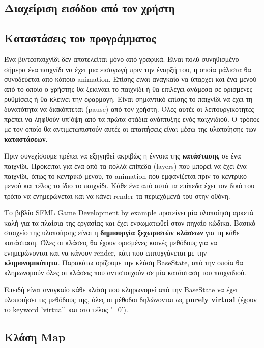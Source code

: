 \documentclass[12pt]{article}
\begin{document}
	
	
	\subsection{Διαχείριση εισόδου από τον χρήστη}
	
	\subsection{Καταστάσεις του προγράμματος}
	Ένα βιντεοπαιχνίδι δεν αποτελείται μόνο από γραφικά. Είναι πολύ συνηθισμένο σήμερα ένα παιχνίδι να έχει μια εισαγωγή πριν την έναρξή του, η οποία μάλιστα θα συνοδεύεται από κάποιο animation. Επίσης είναι αναγκαίο να ύπαρχει και ένα μενού από το οποίο ο χρήστης θα ξεκινάει το παιχνίδι ή θα επιλέγει ανάμεσα σε ορισμένες ρυθμίσεις ή θα κλείνει την εφαρμογή. Είναι σημαντικό επίσης το παιχνίδι να έχει τη δυνατότητα να διακόπτεται (pause) από τον χρήστη. Όλες αυτές οι λειτουργικότητες πρέπει να ληφθούν υπ'όψη από τα πρώτα στάδια ανάπτυξης ενός παιχνιδιού. Ο τρόπος με τον οποίο θα αντιμετωπιστούν αυτές οι απαιτήσεις είναι μέσω της υλοποίησης των \textbf{καταστάσεων}.
	
	Πριν συνεχίσουμε πρέπει να εξηγηθεί ακριβώς η έννοια της \textbf{κατάστασης} σε ένα παιχνίδι. Πρόκειται για ένα από τα πολλά επίπεδα (layers) που μπορεί να έχει ένα παιχνίδι, όπως το κεντρικό μενού, το animation που εμφανίζεται πριν το κεντρικό μενού και τέλος το ίδιο το παιχνίδι. Κάθε ένα από αυτά τα επίπεδα έχει τον δικό του τρόπο να ενημερώνεται και να κάνει render τα περιεχόμενά του στην οθόνη.
	
	Το βιβλίο SFML Game Development by example προτείνει μία υλοποίηση αρκετά καλή για τα πλαίσια της εργασίας και έχει ενσωματωθεί στον πηγαίο κώδικα. Βασικό στοιχείο της υλοποίησης είναι η \textbf{δημιουργία ξεχωριστών κλάσεων} για τη κάθε κατάσταση. Όλες οι κλάσεις θα έχουν ορισμένες κοινές μεθόδους για να ενημερώνονται και να κάνουν render, κάτι που επιτυχγάνεται με την \textbf{κληρονομικότητα}. Παρακάτω ορίζουμε την κλάση BaseState, από την οποία θα κληρωνομούν όλες οι κλάσεις που αντιστοιχούν σε μία κατάσταση του παιχνιδιού.
	
	
	Επειδή είναι αναγκαίο κάθε κλάση που κληρωνομεί από την BaseState να έχει υλοποιήσει τις μεθόδους της, όλες οι μέθοδοι δηλώνονται ως \textbf{purely virtual} (έχουν το keyword 'virtual' και στο τέλος '=0').
	
	\subsection{Κλάση Map}
	
\end{document}
